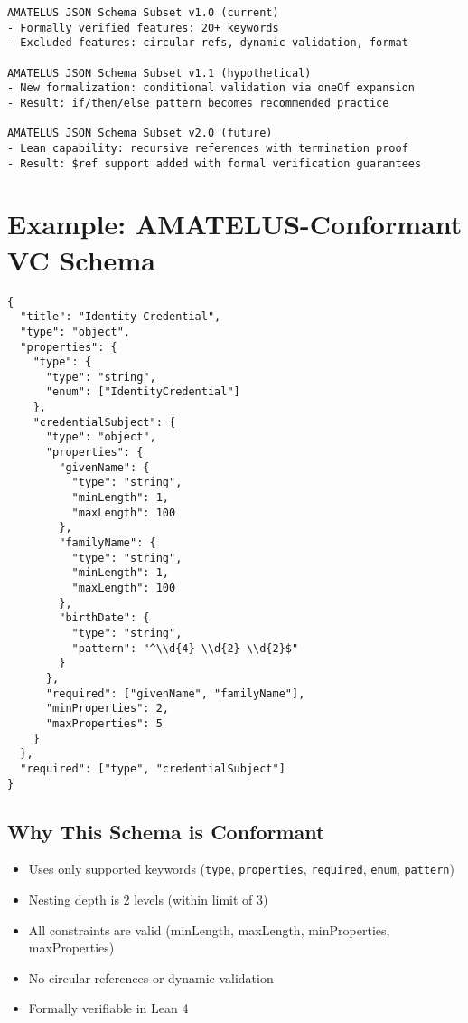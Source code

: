 \begin{verbatim}
AMATELUS JSON Schema Subset v1.0 (current)
- Formally verified features: 20+ keywords
- Excluded features: circular refs, dynamic validation, format

AMATELUS JSON Schema Subset v1.1 (hypothetical)
- New formalization: conditional validation via oneOf expansion
- Result: if/then/else pattern becomes recommended practice

AMATELUS JSON Schema Subset v2.0 (future)
- Lean capability: recursive references with termination proof
- Result: $ref support added with formal verification guarantees
\end{verbatim}

\section{Example: AMATELUS-Conformant VC Schema}

\begin{verbatim}
{
  "title": "Identity Credential",
  "type": "object",
  "properties": {
    "type": {
      "type": "string",
      "enum": ["IdentityCredential"]
    },
    "credentialSubject": {
      "type": "object",
      "properties": {
        "givenName": {
          "type": "string",
          "minLength": 1,
          "maxLength": 100
        },
        "familyName": {
          "type": "string",
          "minLength": 1,
          "maxLength": 100
        },
        "birthDate": {
          "type": "string",
          "pattern": "^\\d{4}-\\d{2}-\\d{2}$"
        }
      },
      "required": ["givenName", "familyName"],
      "minProperties": 2,
      "maxProperties": 5
    }
  },
  "required": ["type", "credentialSubject"]
}
\end{verbatim}

\subsection{Why This Schema is Conformant}

\begin{itemize}
  \item Uses only supported keywords (\texttt{type}, \texttt{properties}, \texttt{required}, \texttt{enum}, \texttt{pattern})
  \item Nesting depth is 2 levels (within limit of 3)
  \item All constraints are valid (minLength, maxLength, minProperties, maxProperties)
  \item No circular references or dynamic validation
  \item Formally verifiable in Lean 4
\end{itemize}

